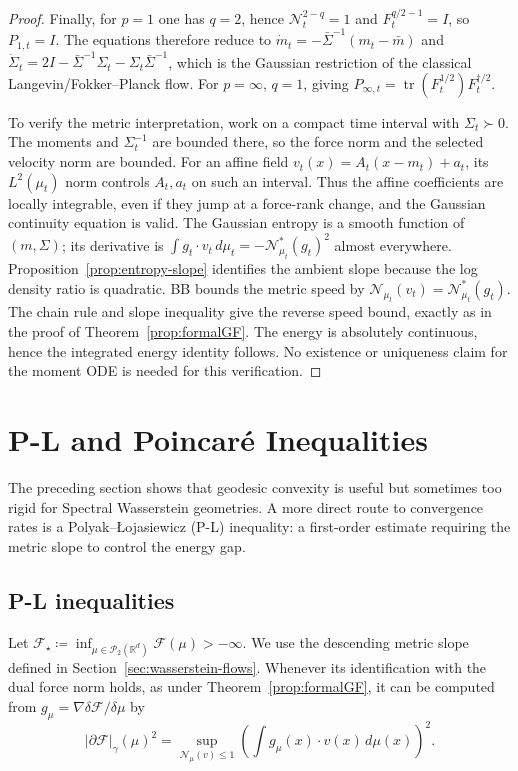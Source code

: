 \documentclass{article}
\newcommand{\R}{\mathbb{R}}
\newcommand{\cP}{\mathcal{P}}
\newcommand{\MF}{\mathcal{F}}
\newcommand{\MN}{\mathcal{N}}
\newcommand{\tr}{\operatorname{tr}}
\begin{document}
\begin{proof}
Finally, for $p=1$ one has $q=2$, hence
$\mathcal N_t^{2-q}=1$ and $F_t^{q/2-1}=I$, so $P_{1,t}=I$. The equations
therefore reduce to
$\dot m_t=-\bar\Sigma^{-1}(m_t-\bar m)$ and
$\dot\Sigma_t=2I-\bar\Sigma^{-1}\Sigma_t-\Sigma_t\bar\Sigma^{-1}$, which is
the Gaussian restriction of the classical Langevin/Fokker--Planck flow. For
$p=\infty$, $q=1$, giving
$P_{\infty,t}=\tr(F_t^{1/2})F_t^{\dagger/2}$.

To verify the metric interpretation, work on a compact time interval with
$\Sigma_t\succ0$. The moments and $\Sigma_t^{-1}$ are bounded there, so the
force norm and the selected velocity norm are bounded. For an affine field
$v_t(x)=A_t(x-m_t)+a_t$, its $L^2(\mu_t)$ norm controls $A_t,a_t$ on such an
interval. Thus the affine coefficients are locally integrable, even if they
jump at a force-rank change, and the Gaussian continuity equation is valid.
The Gaussian entropy is a smooth function of $(m,\Sigma)$; its derivative is
$\int g_t\cdot v_t\,d\mu_t=-\MN_{\mu_t}^*(g_t)^2$ almost everywhere.
Proposition~\ref{prop:entropy-slope} identifies the ambient slope because
the log density ratio is quadratic. BB bounds the metric speed by
$\MN_{\mu_t}(v_t)=\MN_{\mu_t}^*(g_t)$. The chain rule and slope inequality
give the reverse speed bound, exactly as in the proof of
Theorem~\ref{prop:formalGF}. The energy is absolutely continuous, hence the
integrated energy identity follows. No existence or uniqueness claim for
the moment ODE is needed for this verification.
\end{proof}




\section{P-L and Poincar\'e Inequalities}
\label{app:pl-poincare}

The preceding section shows that geodesic convexity is useful but sometimes
too rigid for Spectral Wasserstein geometries.  A more direct route to
convergence rates is a Polyak--\L ojasiewicz (P-L) inequality: a first-order
estimate requiring the metric slope to control the energy gap.

\subsection{P-L inequalities}

Let $\MF_\star\coloneqq\inf_{\mu\in\cP_2(\R^d)}\MF(\mu)>-\infty$.
We use the descending metric slope defined in Section~\ref{sec:wasserstein-flows}.
Whenever its identification with the dual force norm holds, as under
Theorem~\ref{prop:formalGF}, it can be computed from
$g_\mu=\nabla\delta\MF/\delta\mu$ by
\[
    |\partial\MF|_\gamma(\mu)^2
    =
    \sup_{\MN_\mu(v)\le 1}
    \left(\int g_\mu(x)\cdot v(x)\,d\mu(x)\right)^2 .
\]
\end{document}

